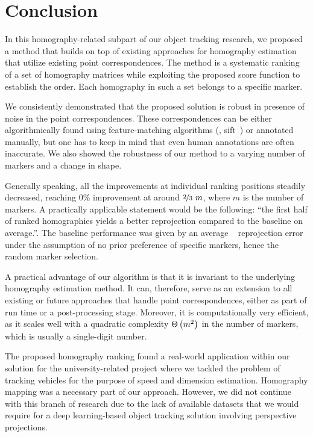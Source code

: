 \section{Conclusion}

In this homography-related subpart of our object tracking research, we proposed a method that builds on top of existing approaches for homography estimation that utilize existing point correspondences. The method is a systematic ranking of a set of homography matrices while exploiting the proposed score function to establish the order. Each homography in such a set belongs to a specific marker.

We consistently demonstrated that the proposed solution is robust in presence of noise in the point correspondences. These correspondences can be either algorithmically found using feature-matching algorithms (\egtext{}, \gls{sift}~\cite{lowel1999objrecognition}) or annotated manually, but one has to keep in mind that even human annotations are often inaccurate. We also showed the robustness of our method to a varying number of markers and a change in shape.

Generally speaking, all the improvements at individual ranking positions steadily decreased, reaching $0$\% improvement at around $\nicefrac{2}{3}~m$, where $m$ is the number of markers. A practically applicable statement would be the following: ``the first half of ranked homographies yields a better reprojection compared to the baseline on average.''. The baseline performance was given by an average \opencv{}~\cite{bradski2008learning} reprojection error under the assumption of no prior preference of specific markers, hence the random marker selection.

A practical advantage of our algorithm is that it is invariant to the underlying homography estimation method. It can, therefore, serve as an extension to all existing or future approaches that handle point correspondences, either as part of run time or a post-processing stage. Moreover, it is computationally very efficient, as it scales well with a quadratic complexity ${\Theta} \left( m^2 \right)$ in the number of markers, which is usually a single-digit number.

The proposed homography ranking found a real-world application within our solution for the university-related \interreg{} project where we tackled the problem of tracking vehicles for the purpose of speed and dimension estimation. Homography mapping was a necessary part of our approach. However, we did not continue with this branch of research due to the lack of available datasets that we would require for a deep learning-based object tracking solution involving perspective projections.

